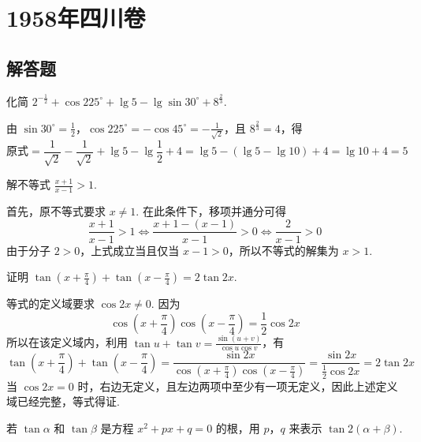 \chapter{1958年四川卷}

\section{解答题}

\begin{problem}
化简 \(2^{-\frac{1}{2}}+\cos225^{\circ}+\lg 5-\lg \sin30^{\circ}+8^{\frac{2}{3}}\).
\end{problem}

\begin{solution}
由 \(\sin30^{\circ}=\frac{1}{2}\)，\(\cos225^{\circ}=-\cos45^{\circ}=-\frac{1}{\sqrt{2}}\)，且 \(8^{\frac{2}{3}}=4\)，得
\[
\text{原式}=\frac{1}{\sqrt{2}}-\frac{1}{\sqrt{2}}+\lg 5-\lg\frac{1}{2}+4
 =\lg 5-\left(\lg 5-\lg 10\right)+4
 =\lg 10+4=5
\]
\end{solution}

\begin{problem}
解不等式 \(\frac{x+1}{x-1}>1\).
\end{problem}

\begin{solution}
首先，原不等式要求 \(x\ne1\). 在此条件下，移项并通分可得
\[
\frac{x+1}{x-1}>1
\Longleftrightarrow
\frac{x+1-(x-1)}{x-1}>0
\Longleftrightarrow
\frac{2}{x-1}>0
\]
由于分子 \(2>0\)，上式成立当且仅当 \(x-1>0\)，所以不等式的解集为 \(x>1\).
\end{solution}

\begin{problem}
证明 \(\tan\left(x+\frac{\pi}{4}\right)+\tan\left(x-\frac{\pi}{4}\right)=2\tan2x\).
\end{problem}

\begin{solution}
等式的定义域要求 \(\cos2x\ne0\). 因为
\[
\cos\left(x+\frac{\pi}{4}\right)\cos\left(x-\frac{\pi}{4}\right)
=\frac{1}{2}\cos2x
\]
所以在该定义域内，利用 \(\tan u+\tan v=\frac{\sin(u+v)}{\cos u\cos v}\)，有
\[
\tan\left(x+\frac{\pi}{4}\right)+\tan\left(x-\frac{\pi}{4}\right)
 =\frac{\sin2x}{\cos\left(x+\frac{\pi}{4}\right)\cos\left(x-\frac{\pi}{4}\right)}
 =\frac{\sin2x}{\frac{1}{2}\cos2x}=2\tan2x
\]
当 \(\cos2x=0\) 时，右边无定义，且左边两项中至少有一项无定义，因此上述定义域已经完整，等式得证.
\end{solution}

\begin{problem}
若 \(\tan\alpha\) 和 \(\tan\beta\) 是方程 \(x^{2}+px+q=0\) 的根，用 \(p\)，\(q\) 来表示 \(\tan2\left(\alpha+\beta\right)\).
\end{problem}

